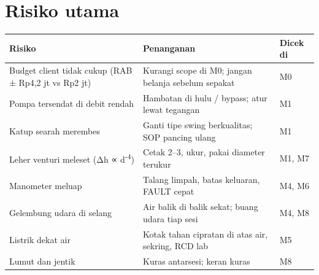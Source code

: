 \documentclass[11pt,a4paper]{article}
\begin{document}
\section{Risiko utama}
\begin{tabularx}{\linewidth}{@{}L L l@{}}
\toprule
\textbf{Risiko} & \textbf{Penanganan} & \textbf{Dicek di} \\
\midrule
Budget client tidak cukup (RAB ± Rp4,2 jt vs Rp2 jt) & Kurangi scope di M0; jangan belanja sebelum sepakat & M0 \\
Pompa tersendat di debit rendah & Hambatan di hulu / bypass; atur lewat tegangan & M1 \\
Katup searah merembes & Ganti tipe swing berkualitas; SOP pancing ulang & M1 \\
Leher venturi meleset (Δh ∝ d\textsuperscript{-4}) & Cetak 2--3, ukur, pakai diameter terukur & M1, M7 \\
Manometer meluap & Talang limpah, batas keluaran, FAULT cepat & M4, M6 \\
Gelembung udara di selang & Air balik di balik sekat; buang udara tiap sesi & M4, M8 \\
Listrik dekat air & Kotak tahan cipratan di atas air, sekring, RCD lab & M5 \\
Lumut dan jentik & Kuras antarsesi; keran kuras & M8 \\
\bottomrule
\end{tabularx}
\end{document}
